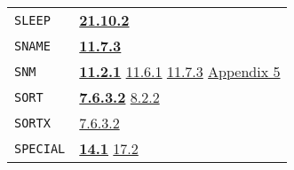 \documentclass[a4paper]{scrbook}
\begin{document}
\begin{longtable}[]{@{}ll@{}}
\begin{minipage}[t]{0.24\columnwidth}\raggedright\strut
\texttt{SLEEP}\strut
\end{minipage} & \begin{minipage}[t]{0.70\columnwidth}\raggedright\strut
\textbf{\href{21-interrupts.md\#21102-sleep}{21.10.2}}\strut
\end{minipage}\tabularnewline
\begin{minipage}[t]{0.24\columnwidth}\raggedright\strut
\texttt{SNAME}\strut
\end{minipage} & \begin{minipage}[t]{0.70\columnwidth}\raggedright\strut
\textbf{\href{11-input-output.md\#1173-sname}{11.7.3}}\strut
\end{minipage}\tabularnewline
\begin{minipage}[t]{0.24\columnwidth}\raggedright\strut
\texttt{SNM}\strut
\end{minipage} & \begin{minipage}[t]{0.70\columnwidth}\raggedright\strut
\textbf{\href{11-input-output.md\#1121-open}{11.2.1}} \href{11-input-output.md\#1161-save}{11.6.1}
\href{11-input-output.md\#1173-sname}{11.7.3} \href{appendix-5-initial-settings.md\#appendix-5-initial-settings}{Appendix
5}\strut
\end{minipage}\tabularnewline
\begin{minipage}[t]{0.24\columnwidth}\raggedright\strut
\texttt{SORT}\strut
\end{minipage} & \begin{minipage}[t]{0.70\columnwidth}\raggedright\strut
\textbf{\href{07-structured-objects.md\#7632-sort}{7.6.3.2}} \href{08-truth.md\#822-equality-and-membership-1}{8.2.2}\strut
\end{minipage}\tabularnewline
\begin{minipage}[t]{0.24\columnwidth}\raggedright\strut
\texttt{SORTX}\strut
\end{minipage} & \begin{minipage}[t]{0.70\columnwidth}\raggedright\strut
\href{07-structured-objects.md\#7632-sort}{7.6.3.2}\strut
\end{minipage}\tabularnewline
\begin{minipage}[t]{0.24\columnwidth}\raggedright\strut
\texttt{SPECIAL}\strut
\end{minipage} & \begin{minipage}[t]{0.70\columnwidth}\raggedright\strut
\textbf{\href{14-data-type-declarations.md\#141-patterns}{14.1}} \href{17-macro-operations.md\#172-eval-macros}{17.2}

\end{minipage}
\end{longtable}
\end{document}
